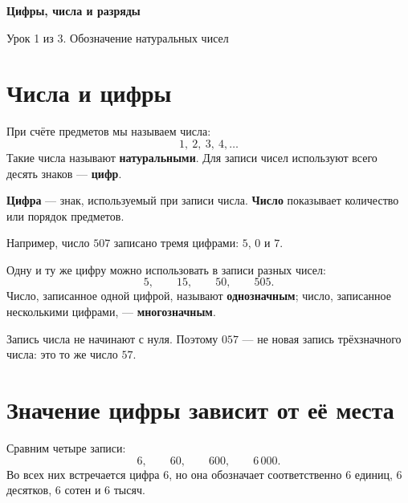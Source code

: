 
\begin{center}
  {\fontsize{25}{30}\selectfont\bfseries\sffamily\color{Primary}
    Цифры, числа и разряды}

  \vspace{0.3em}

  {\large\sffamily\color{GrayText}
    Урок 1 из 3. Обозначение натуральных чисел}
\end{center}

\vspace{0.45em}

\section{Числа и цифры}

При счёте предметов мы называем числа:
\[
  1,\ 2,\ 3,\ 4,\ldots
\]
Такие числа называют \textbf{натуральными}. Для записи чисел используют
всего десять знаков --- \textbf{цифр}.

\digitcardsfigure

\begin{propertybox}
  \textbf{Цифра} --- знак, используемый при записи числа.
  \textbf{Число} показывает количество или порядок предметов.

  Например, число \(507\) записано тремя цифрами: \(5\), \(0\) и \(7\).
\end{propertybox}

Одну и ту же цифру можно использовать в записи разных чисел:
\[
  5,\qquad 15,\qquad 50,\qquad 505.
\]
Число, записанное одной цифрой, называют \textbf{однозначным}; число,
записанное несколькими цифрами, --- \textbf{многозначным}.

\begin{notebox}
  Запись числа не начинают с нуля. Поэтому \(057\) --- не новая запись
  трёхзначного числа: это то же число \(57\).
\end{notebox}

\section{Значение цифры зависит от её места}

Сравним четыре записи:
\[
  6,\qquad 60,\qquad 600,\qquad 6\,000.
\]
Во всех них встречается цифра \(6\), но она обозначает соответственно
\(6\) единиц, \(6\) десятков, \(6\) сотен и \(6\) тысяч.

